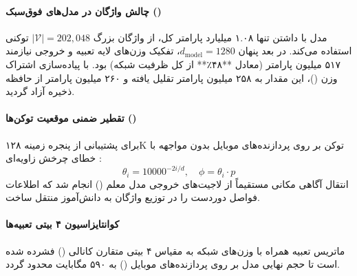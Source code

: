 \item {}

\paragraph*{چالش واژگان در مدل‌های فوق‌سبک ()}
مدل  \cite{meta2025mobilellmpro} با داشتن تنها ۱.۰۸ میلیارد پارامتر کل، از واژگان بزرگ $|\mathcal{V}| = 202{,}048$ توکنی  استفاده می‌کند. در بعد پنهان $d_{\text{model}} = 1280$، تفکیک وزن‌های لایه تعبیه و خروجی نیازمند ۵۱۷ میلیون پارامتر (معادل **۴۸٪** از کل ظرفیت شبکه) بود. با پیاده‌سازی اشتراک وزن ()، این مقدار به ۲۵۸ میلیون پارامتر تقلیل یافته و ۲۶۰ میلیون پارامتر از حافظه ذخیره آزاد گردید.

\paragraph*{تقطیر ضمنی موقعیت توکن‌ها ()}
برای پشتیبانی از پنجره زمینه ۱۲۸K توکن بر روی پردازنده‌های موبایل بدون مواجهه با خطای چرخش زاویه‌ای :
\begin{equation}
    \theta_i = 10000^{-2i/d}, \quad \phi = \theta_i \cdot p
\end{equation}
انتقال آگاهی مکانی مستقیماً از لاجیت‌های خروجی مدل معلم () انجام شد که اطلاعات فواصل دوردست را در توزیع واژگان به دانش‌آموز منتقل ساخت.

\paragraph*{کوانتایزاسیون ۴ بیتی تعبیه‌ها}
ماتریس تعبیه همراه با وزن‌های شبکه به مقیاس ۴ بیتی متقارن کانالی () فشرده شده است تا حجم نهایی مدل بر روی پردازنده‌های موبایل () به ۵۹۰ مگابایت محدود گردد.